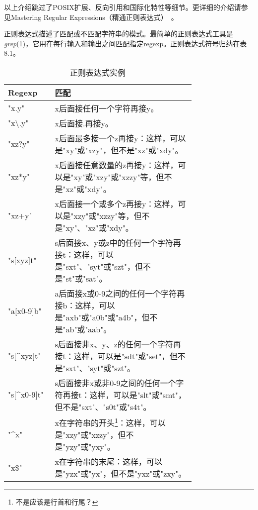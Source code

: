 \documentclass[12pt,oneside]{ctexbook}
\begin{document}
\begin{common-format}
以上介绍跳过了POSIX扩展、反向引用和国际化特性等细节。更详细的介绍请参见Mastering  Regular Expressions（精通正则表达式）~\cite{Friedl}。

正则表达式描述了匹配或不匹配字符串的模式。最简单的正则表达式工具是\textit{grep}(1)，它用在每行输入和输出之间匹配指定regexp。正则表达式符号归纳在表8.1。

\noindent
\begin{minipage}{\linewidth}
\begin{table}[H]
\centering
\caption{正则表达式实例}
\medskip
\begin{tabular}{@{}lp{0.75\linewidth}@{}}
\toprule
Regexp & 匹配  \\ \midrule
"x.y" & x后面接任何一个字符再接y。 \\
"x\textbackslash{}.y" &	x后面接.再接y。 \\
"xz?y" & x后面最多接一个z再接y：这样，可以是"xy"或"xzy"，但不是"xz"或"xdy"。 \\
"xz*y" & x后面接任意数量的z再接y：这样，可以是"xy"或"xzy"或"xzzy"等，但不是"xz"或"xdy"。 \\
"xz+y" & x后面接一个或多个z再接y：这样，可以是"xzy"或"xzzy"等，但不是"xy"、"xz"或"xdy"。 \\
"s[xyz]t" &  s后面接x、y或z中的任何一个字符再接t：这样，可以是"sxt"、"syt"或"szt"，但不是"st"或"sat"。 \\
"a[x0-9]b" & 	a后面接x或0-9之间的任何一个字符再接b：这样，可以是"axb"或"a0b"或"a4b"，但不是"ab"或"aab"。 \\
"s[\^{}xyz]t" & s后面接非x、y、z的任何一个字符再接t：这样，可以是"sdt"或"set"，但不是"sxt"、"syt"或"szt"。\\
"s[\^{}x0-9]t" & s后面接非x或非0-9之间的任何一个字符再接t：这样，可以是"slt"或"smt"，但不是"sxt"、"s0t"或"s4t"。\\
"\^{}x"	& x在字符串的开头\footnote{不是应该是行首和行尾？}：这样，可以是"xzy"或"xzzy"，但不是"yzy"或"yxy"。\\
"x\${}" & x在字符串的末尾：这样，可以是"yzx"或"yx"，但不是"yxz"或"zxy"。
\\ \bottomrule
\end{tabular}
\end{table}
\end{minipage}


\end{common-format}
\end{document}

